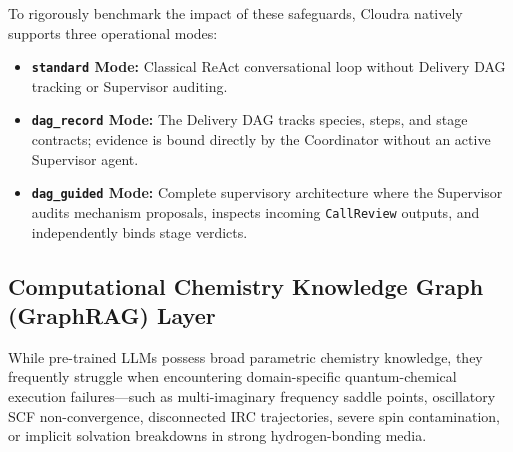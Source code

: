 \documentclass[10pt,twocolumn,letterpaper]{article}
\begin{document}
To rigorously benchmark the impact of these safeguards, Cloudra natively supports three operational modes:
\begin{itemize}[leftmargin=*]
\item \textbf{\texttt{standard} Mode:} Classical ReAct conversational loop without Delivery DAG tracking or Supervisor auditing.
\item \textbf{\texttt{dag\_record} Mode:} The Delivery DAG tracks species, steps, and stage contracts; evidence is bound directly by the Coordinator without an active Supervisor agent.
\item \textbf{\texttt{dag\_guided} Mode:} Complete supervisory architecture where the Supervisor audits mechanism proposals, inspects incoming \texttt{CallReview} outputs, and independently binds stage verdicts.
\end{itemize}

\subsection{Computational Chemistry Knowledge Graph (GraphRAG) Layer}
While pre-trained LLMs possess broad parametric chemistry knowledge, they frequently struggle when encountering domain-specific quantum-chemical execution failures---such as multi-imaginary frequency saddle points, oscillatory SCF non-convergence, disconnected IRC trajectories, severe spin contamination, or implicit solvation breakdowns in strong hydrogen-bonding media.
\end{document}
